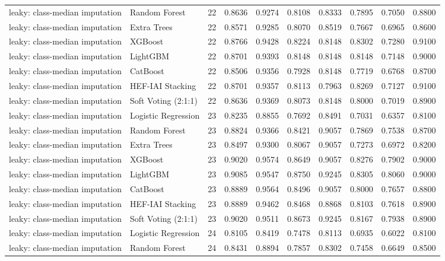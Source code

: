 \begin{tabular}{llrrrrrrrr}
leaky: class-median imputation & Random Forest & 22 & 0.8636 & 0.9274 & 0.8108 & 0.8333 & 0.7895 & 0.7050 & 0.8800 \\
leaky: class-median imputation & Extra Trees & 22 & 0.8571 & 0.9285 & 0.8070 & 0.8519 & 0.7667 & 0.6965 & 0.8600 \\
leaky: class-median imputation & XGBoost & 22 & 0.8766 & 0.9428 & 0.8224 & 0.8148 & 0.8302 & 0.7280 & 0.9100 \\
leaky: class-median imputation & LightGBM & 22 & 0.8701 & 0.9393 & 0.8148 & 0.8148 & 0.8148 & 0.7148 & 0.9000 \\
leaky: class-median imputation & CatBoost & 22 & 0.8506 & 0.9356 & 0.7928 & 0.8148 & 0.7719 & 0.6768 & 0.8700 \\
leaky: class-median imputation & HEF-IAI Stacking & 22 & 0.8701 & 0.9357 & 0.8113 & 0.7963 & 0.8269 & 0.7127 & 0.9100 \\
leaky: class-median imputation & Soft Voting (2:1:1) & 22 & 0.8636 & 0.9369 & 0.8073 & 0.8148 & 0.8000 & 0.7019 & 0.8900 \\
leaky: class-median imputation & Logistic Regression & 23 & 0.8235 & 0.8855 & 0.7692 & 0.8491 & 0.7031 & 0.6357 & 0.8100 \\
leaky: class-median imputation & Random Forest & 23 & 0.8824 & 0.9366 & 0.8421 & 0.9057 & 0.7869 & 0.7538 & 0.8700 \\
leaky: class-median imputation & Extra Trees & 23 & 0.8497 & 0.9300 & 0.8067 & 0.9057 & 0.7273 & 0.6972 & 0.8200 \\
leaky: class-median imputation & XGBoost & 23 & 0.9020 & 0.9574 & 0.8649 & 0.9057 & 0.8276 & 0.7902 & 0.9000 \\
leaky: class-median imputation & LightGBM & 23 & 0.9085 & 0.9547 & 0.8750 & 0.9245 & 0.8305 & 0.8060 & 0.9000 \\
leaky: class-median imputation & CatBoost & 23 & 0.8889 & 0.9564 & 0.8496 & 0.9057 & 0.8000 & 0.7657 & 0.8800 \\
leaky: class-median imputation & HEF-IAI Stacking & 23 & 0.8889 & 0.9462 & 0.8468 & 0.8868 & 0.8103 & 0.7618 & 0.8900 \\
leaky: class-median imputation & Soft Voting (2:1:1) & 23 & 0.9020 & 0.9511 & 0.8673 & 0.9245 & 0.8167 & 0.7938 & 0.8900 \\
leaky: class-median imputation & Logistic Regression & 24 & 0.8105 & 0.8419 & 0.7478 & 0.8113 & 0.6935 & 0.6022 & 0.8100 \\
leaky: class-median imputation & Random Forest & 24 & 0.8431 & 0.8894 & 0.7857 & 0.8302 & 0.7458 & 0.6649 & 0.8500 \\

\end{tabular}
